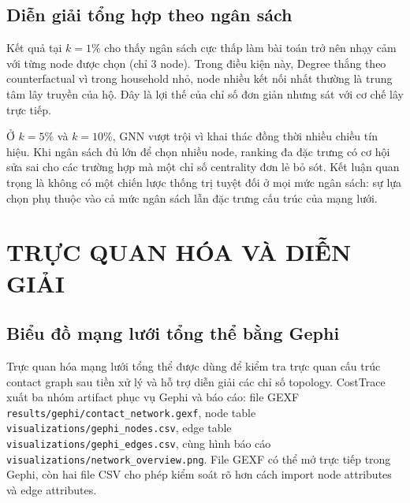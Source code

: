 \documentclass[12pt,a4paper]{report}
\theoremstyle{definition}
\begin{document}
\section{Diễn giải tổng hợp theo ngân sách}

Kết quả tại $k=1\%$ cho thấy ngân sách cực thấp làm bài toán trở nên nhạy cảm với từng node được chọn (chỉ 3 node). Trong điều kiện này, Degree thắng theo counterfactual vì trong household nhỏ, node nhiều kết nối nhất thường là trung tâm lây truyền của hộ. Đây là lợi thế của chỉ số đơn giản nhưng sát với cơ chế lây trực tiếp.

Ở $k=5\%$ và $k=10\%$, GNN vượt trội vì khai thác đồng thời nhiều chiều tín hiệu. Khi ngân sách đủ lớn để chọn nhiều node, ranking đa đặc trưng có cơ hội sửa sai cho các trường hợp mà một chỉ số centrality đơn lẻ bỏ sót. Kết luận quan trọng là không có một chiến lược thống trị tuyệt đối ở mọi mức ngân sách: sự lựa chọn phụ thuộc vào cả mức ngân sách lẫn đặc trưng cấu trúc của mạng lưới.

\chapter{TRỰC QUAN HÓA VÀ DIỄN GIẢI}

\section{Biểu đồ mạng lưới tổng thể bằng Gephi}
\label{sec:gephi_network_visualization}

Trực quan hóa mạng lưới tổng thể được dùng để kiểm tra trực quan cấu trúc contact graph sau tiền xử lý và hỗ trợ diễn giải các chỉ số topology. CostTrace xuất ba nhóm artifact phục vụ Gephi và báo cáo: file GEXF \texttt{results/gephi/contact\_network.gexf}, node table \texttt{visualizations/gephi\_nodes.csv}, edge table \texttt{visualizations/gephi\_edges.csv}, cùng hình báo cáo \texttt{visualizations/network\_overview.png}. File GEXF có thể mở trực tiếp trong Gephi, còn hai file CSV cho phép kiểm soát rõ hơn cách import node attributes và edge attributes.
\end{document}
